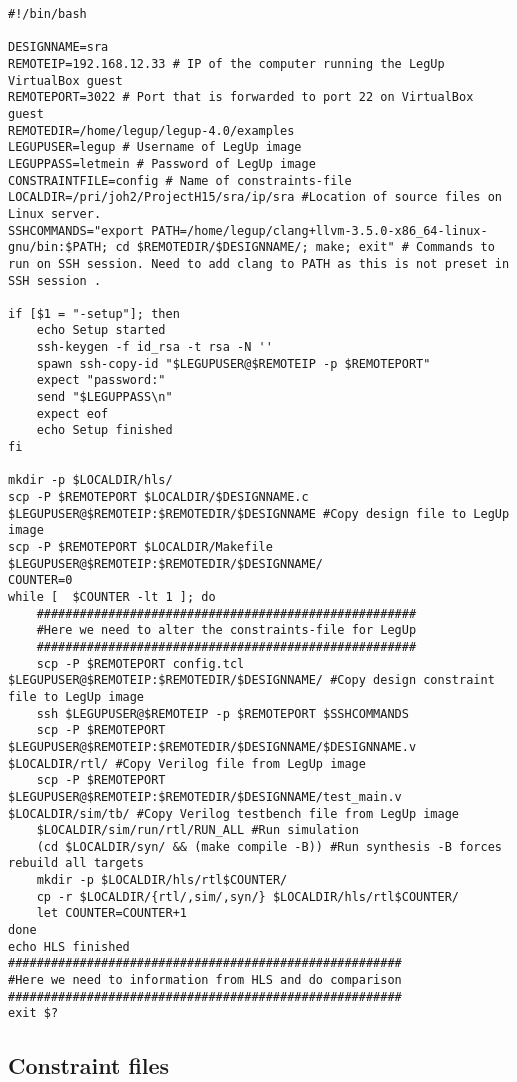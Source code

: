 \begin{lstlisting}
#!/bin/bash

DESIGNNAME=sra
REMOTEIP=192.168.12.33 # IP of the computer running the LegUp VirtualBox guest
REMOTEPORT=3022 # Port that is forwarded to port 22 on VirtualBox guest
REMOTEDIR=/home/legup/legup-4.0/examples
LEGUPUSER=legup # Username of LegUp image
LEGUPPASS=letmein # Password of LegUp image
CONSTRAINTFILE=config # Name of constraints-file
LOCALDIR=/pri/joh2/ProjectH15/sra/ip/sra #Location of source files on Linux server.
SSHCOMMANDS="export PATH=/home/legup/clang+llvm-3.5.0-x86_64-linux-gnu/bin:$PATH; cd $REMOTEDIR/$DESIGNNAME/; make; exit" # Commands to run on SSH session. Need to add clang to PATH as this is not preset in SSH session .

if [$1 = "-setup"]; then
	echo Setup started
	ssh-keygen -f id_rsa -t rsa -N ''
	spawn ssh-copy-id "$LEGUPUSER@$REMOTEIP -p $REMOTEPORT"
	expect "password:"
	send "$LEGUPPASS\n"
	expect eof
	echo Setup finished
fi

mkdir -p $LOCALDIR/hls/
scp -P $REMOTEPORT $LOCALDIR/$DESIGNNAME.c $LEGUPUSER@$REMOTEIP:$REMOTEDIR/$DESIGNNAME #Copy design file to LegUp image
scp -P $REMOTEPORT $LOCALDIR/Makefile $LEGUPUSER@$REMOTEIP:$REMOTEDIR/$DESIGNNAME/
COUNTER=0
while [  $COUNTER -lt 1 ]; do
	#####################################################
	#Here we need to alter the constraints-file for LegUp
	#####################################################
	scp -P $REMOTEPORT config.tcl $LEGUPUSER@$REMOTEIP:$REMOTEDIR/$DESIGNNAME/ #Copy design constraint file to LegUp image
	ssh $LEGUPUSER@$REMOTEIP -p $REMOTEPORT $SSHCOMMANDS
	scp -P $REMOTEPORT $LEGUPUSER@$REMOTEIP:$REMOTEDIR/$DESIGNNAME/$DESIGNNAME.v $LOCALDIR/rtl/ #Copy Verilog file from LegUp image
	scp -P $REMOTEPORT $LEGUPUSER@$REMOTEIP:$REMOTEDIR/$DESIGNNAME/test_main.v $LOCALDIR/sim/tb/ #Copy Verilog testbench file from LegUp image
	$LOCALDIR/sim/run/rtl/RUN_ALL #Run simulation
	(cd $LOCALDIR/syn/ && (make compile -B)) #Run synthesis -B forces rebuild all targets
	mkdir -p $LOCALDIR/hls/rtl$COUNTER/
	cp -r $LOCALDIR/{rtl/,sim/,syn/} $LOCALDIR/hls/rtl$COUNTER/
	let COUNTER=COUNTER+1 
done
echo HLS finished
#######################################################
#Here we need to information from HLS and do comparison
#######################################################
exit $?
\end{lstlisting}

\subsection{Constraint files}


